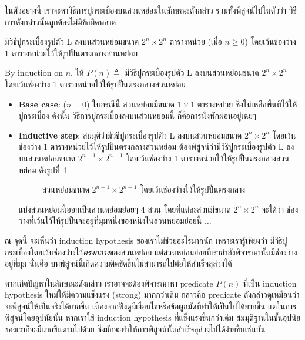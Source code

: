 ในตัวอย่างนี้ เราจะหาวิธีการปูกระเบื้องบนสวนหย่อมในลักษณะดังกล่าว รวมทั้งพิสูจน์ไปในตัวว่า วิธีการดังกล่าวนั้นถูกต้องไม่มีข้อผิดพลาด
%
\begin{theorem}
มีวิธีปูกระเบื้องรูปตัว L ลงบนสวนหย่อมขนาด $2^n\times 2^n$ ตารางหน่วย (เมื่อ $n\geq 0$) โดยเว้นช่องว่าง 1 ตารางหน่วยไว้ให้รูปปั้นตรงกลางสวนหย่อม
\begin{pf}
By induction on $n$.  ให้ $P(n)\triangleq$ มีวิธีปูกระเบื้องรูปตัว L ลงบนสวนหย่อมขนาด $2^n\times 2^n$ โดยเว้นช่องว่าง 1 ตารางหน่วยไว้ให้รูปปั้นตรงกลางสวนหย่อม
\begin{itemize}
\item {\bf Base case}: ($n=0$) \quad ในกรณีนี้ สวนหย่อมมีขนาด $1\times 1$ ตารางหน่วย ซึ่งไม่เหลือพื้นที่ไว้ให้ปูกระเบื้อง ดังนั้น วิธีการปูกระเบื้องลงบนสวนหย่อมนี้ ก็คือการนั่งพักผ่อนอยู่เฉยๆ \quad\yea
\item {\bf Inductive step}: สมมุติว่ามีวิธีปูกระเบื้องรูปตัว L ลงบนสวนหย่อมขนาด $2^n\times 2^n$ โดยเว้นช่องว่าง 1 ตารางหน่วยไว้ให้รูปปั้นตรงกลางสวนหย่อม ต้องพิสูจน์ว่ามีวิธีปูกระเบื้องรูปตัว L ลงบนสวนหย่อมขนาด $2^{n+1}\times 2^{n+1}$ โดยเว้นช่องว่าง 1 ตารางหน่วยไว้ให้รูปปั้นตรงกลางสวนหย่อม ดังรูปที่~\ref{fig:courtyard-n+1}
%
\begin{figure}
\centering
{}
\caption{สวนหย่อมขนาด $2^{n+1}\times 2^{n+1}$ โดยเว้นช่องว่างไว้ให้รูปปั้นตรงกลาง}
\label{fig:courtyard-n+1}
\end{figure}
%
\enskip แบ่งสวนหย่อมนี้ออกเป็นสวนหย่อมย่อยๆ 4 สวน โดยที่แต่ละสวนมีขนาด $2^n\times 2^n$ จะได้ว่า ช่องว่างที่เว้นไว้ให้รูปปั้นจะอยู่ที่มุมหนึ่งของหนึ่งในสวนหย่อมย่อยนี้ $\ldots$
\end{itemize}
ณ จุดนี้ จะเห็นว่า induction hypothesis ของเราไม่ช่วยอะไรมากนัก เพราะเรารู้เพียงว่า มีวิธีปูกระเบื้องโดยเว้นช่องว่างไว้\emph{ตรงกลาง}ของสวนหย่อม แต่สวนหย่อมย่อยที่เรากำลังพิจารณานั้นมีช่องว่างอยู่ที่มุม \enskip นั่นคือ บทพิสูจน์นี้เกิดความติดขัดขึ้นไม่สามารถไปต่อให้สำเร็จลุล่วงได้
\end{pf}

หากเกิดปัญหาในลักษณะดังกล่าว เราอาจจะต้องพิจารณาหา predicate $P(n)$ ที่เป็น induction hypothesis ใหม่ให้มีความแข็งแรง (strong) มากกว่าเดิม กล่าวคือ predicate ดังกล่าวดูเหมือนว่าจะพิสูจน์ให้เป็นจริงได้ยากขึ้น เนื่องจากฟังดูมีเงื่อนไขหรือข้อผูกมัดที่ทำให้เป็นไปได้ยากขึ้น แต่ในการพิสูจน์โดยอุปนัยนั้น หากเราใช้ induction hypothesis ที่แข็งแรงขึ้นกว่าเดิม สมมุติฐานในขั้นอุปนัยของเราก็จะมีมากขึ้นตามไปด้วย ซึ่งมักจะทำให้การพิสูจน์นั้นสำเร็จลุล่วงไปได้ง่ายขึ้นเช่นกัน


\end{theorem}
